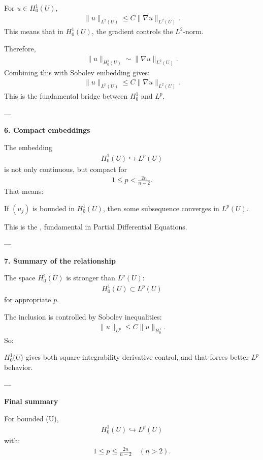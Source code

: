 \documentclass[12pt,a4paper]{report}
\begin{document}
\begin{description}
\begin{description}
For $u\in H_0^1(U)$,
\begin{align*}
\|u\|_{L^2(U)} \le C\|\nabla u\|_{L^2(U)}.
\end{align*}
This means that in $H_0^1(U)$, the gradient controls the $L^2$-norm.

Therefore,
\begin{align*}
\|u\|_{H_0^1(U)} \sim \|\nabla u\|_{L^2(U)}.
\end{align*}
Combining this with Sobolev embedding gives:
\begin{align*}
\|u\|_{L^p(U)} \le C\|\nabla u\|_{L^2(U)}.
\end{align*}
This is the fundamental bridge between $H_0^1$ and $L^p$.

---

\item \textbf{6. Compact embeddings}

The embedding
\begin{align*}
H_0^1(U)\hookrightarrow L^p(U)
\end{align*}
is not only continuous, but compact for
\begin{align*}
1\le p<\frac{2n}{n-2}.
\end{align*}
That means:

If $(u_j)$ is bounded in $H_0^1(U)$, then some subsequence converges  in $L^p(U)$.

This is the , fundamental in Partial Differential Equations.

---

\item \textbf{7. Summary of the relationship}

The space $H_0^1(U)$ is stronger than $L^p(U)$:
\begin{align*}
H_0^1(U)\subset L^p(U)
\end{align*}
for appropriate $p$.

The inclusion is controlled by Sobolev inequalities:
\begin{align*}
\|u\|_{L^p}\le C\|u\|_{H_0^1}.
\end{align*}
So:

\> $H_0^1(U$) gives both square integrability  derivative control, and that forces better $L^p$ behavior.

---

\item \textbf{Final summary}

For bounded (U),
\begin{align*}
H_0^1(U)\hookrightarrow L^p(U)
\end{align*}
with:
\begin{align*}
1\le p\le \frac{2n}{n-2}\quad (n>2).
\end{align*}


\end{description}
\end{description}
\end{document}
